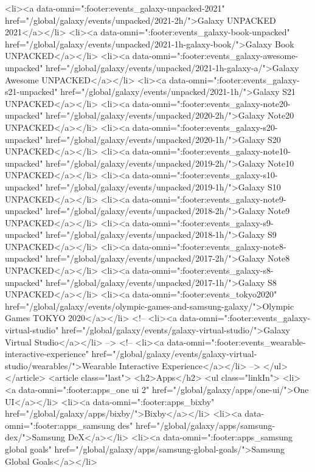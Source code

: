 {{{{{{{{{{{{{{{{{{{{{{{{{{{{{{{{{{{{{{{{{{{{{{{{{{{{{		<li><a data-omni=":footer:events_galaxy-unpacked-2021" href="/global/galaxy/events/unpacked/2021-2h/">Galaxy UNPACKED 2021</a></li>
		<li><a data-omni=":footer:events_galaxy-book-unpacked" href="/global/galaxy/events/unpacked/2021-1h-galaxy-book/">Galaxy Book UNPACKED</a></li>
		<li><a data-omni=":footer:events_galaxy-awesome-unpacked" href="/global/galaxy/events/unpacked/2021-1h-galaxy-a/">Galaxy Awesome UNPACKED</a></li>
		<li><a data-omni=":footer:events_galaxy-s21-unpacked" href="/global/galaxy/events/unpacked/2021-1h/">Galaxy S21 UNPACKED</a></li>
		<li><a data-omni=":footer:events_galaxy-note20-unpacked" href="/global/galaxy/events/unpacked/2020-2h/">Galaxy Note20 UNPACKED</a></li>
		<li><a data-omni=":footer:events_galaxy-s20-unpacked" href="/global/galaxy/events/unpacked/2020-1h/">Galaxy S20 UNPACKED</a></li>
		<li><a data-omni=":footer:events_galaxy-note10-unpacked" href="/global/galaxy/events/unpacked/2019-2h/">Galaxy Note10 UNPACKED</a></li>
		<li><a data-omni=":footer:events_galaxy-s10-unpacked" href="/global/galaxy/events/unpacked/2019-1h/">Galaxy S10 UNPACKED</a></li>
		<li><a data-omni=":footer:events_galaxy-note9-unpacked" href="/global/galaxy/events/unpacked/2018-2h/">Galaxy Note9 UNPACKED</a></li>
		<li><a data-omni=":footer:events_galaxy-s9-unpacked" href="/global/galaxy/events/unpacked/2018-1h/">Galaxy S9 UNPACKED</a></li>
		<li><a data-omni=":footer:events_galaxy-note8-unpacked" href="/global/galaxy/events/unpacked/2017-2h/">Galaxy Note8 UNPACKED</a></li>
		<li><a data-omni=":footer:events_galaxy-s8-unpacked" href="/global/galaxy/events/unpacked/2017-1h/">Galaxy S8 UNPACKED</a></li>
		<li><a data-omni=":footer:events_tokyo2020" href="/global/galaxy/events/olympic-games-and-samsung-galaxy/">Olympic Games TOKYO 2020</a></li>
		<!-- <li><a data-omni=":footer:events_galaxy-virtual-studio" href="/global/galaxy/events/galaxy-virtual-studio/">Galaxy Virtual Studio</a></li> -->
		<!-- <li><a data-omni=":footer:events_wearable-interactive-experience" href="/global/galaxy/events/galaxy-virtual-studio/wearables/">Wearable Interactive Experience</a></li> -->
	</ul>
</article>
<article class="last">
	<h2>Apps</h2>
	<ul class="linkIn">
		<li><a data-omni=":footer:apps_one ui 2" href="/global/galaxy/apps/one-ui/">One UI</a></li>
		<li><a data-omni=":footer:apps_bixby" href="/global/galaxy/apps/bixby/">Bixby</a></li>
		<li><a data-omni=":footer:apps_samsung des" href="/global/galaxy/apps/samsung-dex/">Samsung DeX</a></li>
		<li><a data-omni=":footer:apps_samsung global goals" href="/global/galaxy/apps/samsung-global-goals/">Samsung Global Goals</a></li>
}}}}}}}}}}}}}}}}}}}}}}}}}}}}}}}}}}}}}}}}}}}}}}}}}}}}}
